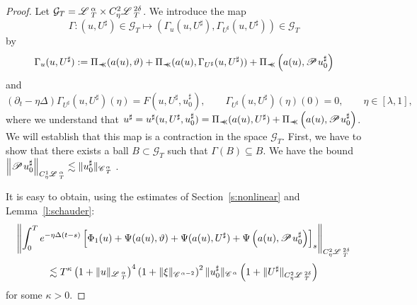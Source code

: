 \documentclass[11pt,reqno]{amsart}
\newcommand{\assign}{:=}
\newcommand{\precprec}{\prec\!\!\!\prec}
\newcommand{\CC}{\mathscr{C} \hspace{.1em}}
\newcommand{\LL}{\mathscr{L} \hspace{.2em}}
\newcommand{\PP}{\mathscr{P} \hspace{.1em}}
\begin{document}
\begin{proof}
  Let $\mathcal{G}_T = \LL^{\alpha}_T \times C_{\eta}^2 \LL^{2 \delta}_T$. We
  introduce the map
  \[ \Gamma : (u, U^{\sharp}) \in \mathcal{G}_T \mapsto (\Gamma_u (u,
     U^{\sharp}), \Gamma_{U^{\sharp}} (u, U^{\sharp})) \in \mathcal{G}_T \]
  by
  \[ \Gamma_u (u, U^{\sharp}) \assign \Pi_{\precprec} (a (u), \vartheta) +
     \Pi_{\precprec} (a (u), \Gamma_{U^{\sharp}} (u, U^{\sharp})) +
     \Pi_{\precprec} \left( a (u), \PP u_0^{\sharp} \right) \]
  and
  \[ (\partial_t - \eta \Delta) \Gamma_{U^{\sharp}} (u, U^{\sharp}) (\eta) = F
     (u, U^{\sharp}, u_0^{\sharp}), \qquad \Gamma_{U^{\sharp}} (u, U^{\sharp})
     (\eta) (0) = 0, \qquad \eta \in [\lambda, 1], \]
  where we understand that $u^{\sharp} = u^{\sharp} (u, U^{\sharp},
  u_0^{\sharp}) = \Pi_{\precprec} (a (u), U^{\sharp}) + \Pi_{\precprec} \left(
  a (u), \PP u_0^{\sharp} \right)$. We will establish that this map is a
  contraction in the space $\mathcal{G}_T .$ First, we have to show that there
  exists a ball $B \subset \mathcal{G}_T$ such that $\Gamma (B) \subseteq B$.
  We have the bound $\left\| \PP u_0^{\sharp} \right\|_{C^1_{\eta}
  \LL^{\alpha}_T} \lesssim \| u^{\sharp}_0 \|_{\CC^{\alpha}_T}$ .
  
  It is easy to obtain, using the estimates of Section~\ref{s:nonlinear} and
  Lemma~\ref{l:schauder}:
  \[ \left\| \int_0^T e^{- \eta \Delta (t - s)} \left[ \Phi_1 (u) + \Psi (a
     (u), \vartheta) + \Psi (a (u), U^{\sharp}) + \Psi \left( a (u), \PP
     u_0^{\sharp} \right) \right]_s \right\|_{C^2_{\eta} \LL_T^{2 \delta}} \]
  \[ \lesssim T^{\kappa} \left( 1 + \| u \|_{\LL^{\alpha}_T} \right)^4 \left(
     1 + \| \xi \|_{\CC^{\alpha - 2}} \right)^2 \| u_0^{\sharp}
     \|_{\CC^{\alpha}} \left( 1 + \| U^{\sharp} \|_{C^2_{\eta} \LL^{2
     \delta}_T} \right) \]
  for some $\kappa > 0$.
  

\end{proof}
\end{document}
